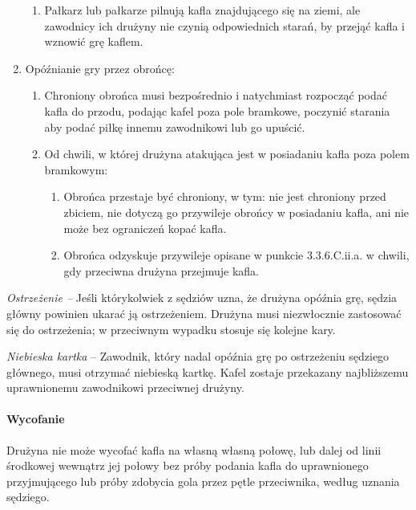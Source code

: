 \documentclass[12pt]{article}
\begin{document}
\begin{enumerate}
\begin{enumerate}
		      \item Pałkarz lub pałkarze pilnują kafla znajdującego się na ziemi, ale
		            zawodnicy ich drużyny nie czynią odpowiednich starań, by przejąć kafla i
		            wznowić grę kaflem.
	      \end{enumerate}

	\item Opóźnianie gry przez obrońcę:
	      \begin{enumerate}
		      \item Chroniony obrońca musi bezpośrednio i natychmiast rozpocząć podać
		            kafla do przodu, podając kafel poza pole bramkowe, poczynić starania aby
		            podać piłkę innemu zawodnikowi lub go upuścić.

		      \item Od chwili, w której drużyna atakująca jest w posiadaniu kafla poza
		            polem bramkowym:
		            \begin{enumerate}
			            \item Obrońca przestaje być chroniony, w tym: nie jest chroniony przed
			                  zbiciem, nie dotyczą go przywileje obrońcy w posiadaniu kafla, ani nie
			                  może bez ograniczeń kopać kafla.

			            \item Obrońca odzyskuje przywileje opisane w punkcie 3.3.6.C.ii.a.
			                  w chwili, gdy przeciwna drużyna przejmuje kafla.
		            \end{enumerate}
	      \end{enumerate}
\end{enumerate}

\emph{Ostrzeżenie --} Jeśli którykolwiek z sędziów uzna, że drużyna
opóźnia grę, sędzia główny powinien ukarać ją ostrzeżeniem. Drużyna musi
niezwłocznie zastosować się do ostrzeżenia; w przeciwnym wypadku stosuje
się kolejne kary.

\emph{Niebieska kartka} -- Zawodnik, który nadal opóźnia grę po
ostrzeżeniu sędziego głównego, musi otrzymać niebieską kartkę. Kafel
zostaje przekazany najbliższemu uprawnionemu zawodnikowi przeciwnej
drużyny.

\paragraph{Wycofanie}
Drużyna nie może wycofać kafla na własną
własną połowę, lub dalej od linii środkowej wewnątrz jej połowy bez
próby podania kafla do uprawnionego przyjmującego lub próby zdobycia
gola przez pętle przeciwnika, według uznania sędziego.
\end{document}
